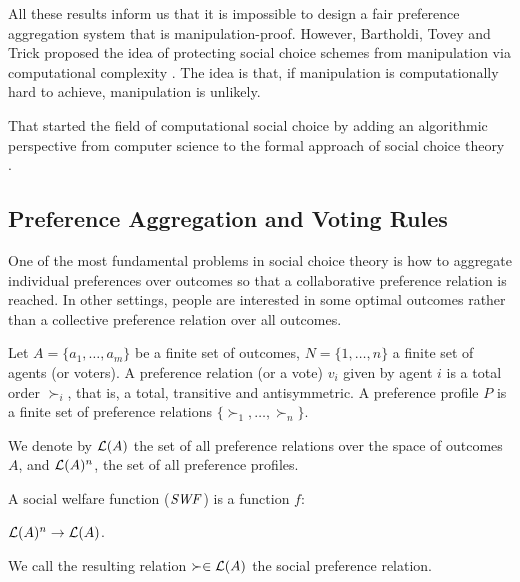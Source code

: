 All these results inform us that it is impossible to design a fair preference
aggregation system that is manipulation-proof.
However, Bartholdi, Tovey and Trick proposed the idea of protecting
social choice schemes from manipulation via computational
complexity \cite{bartholdi:j:whowon,bartholdi:j:compdiff,
bartholdi:j:howhard}.
The idea is that, if manipulation is computationally hard to
achieve, manipulation is unlikely.

That started the field of computational social choice by adding an algorithmic
perspective from computer science to the formal approach 
of social choice theory \cite{Brandt:COMSOC}.




\subsection{Preference Aggregation and Voting Rules}
One of the most fundamental problems in social choice theory is how to
aggregate individual preferences over outcomes so that a
collaborative preference relation is reached.
In other settings, people are interested in some optimal outcomes
rather than a collective preference relation over all outcomes.

\begin{definition}
	Let $A=\{a_1,\ldots,a_m\}$ be a finite set of outcomes,
	$N=\{1,\ldots,n\}$ a finite set of agents (or voters).
	A preference relation (or a vote) $v_i$ given by agent $i$ 
	is a total order $\succ_i$,
	that is, a total, transitive and antisymmetric.
	A preference profile $P$ is a finite set of preference relations
	$\{\succ_1, \ldots, \succ_n\}$.
\end{definition}

We denote by $\mathcal{L}(A)$ the set of all preference relations over
the space of outcomes $A$, and $\mathcal{L}(A)^n$, the set of all
preference profiles.

\begin{definition}
	A social welfare function ($\it{SWF}$) is a function $f$:
	\begin{center}
		$\mathcal{L}(A)^n \rightarrow \mathcal{L}(A)$.
	\end{center}
	We call the resulting relation $\succ \in \mathcal{L}(A)$ the social preference relation.
\end{definition}

